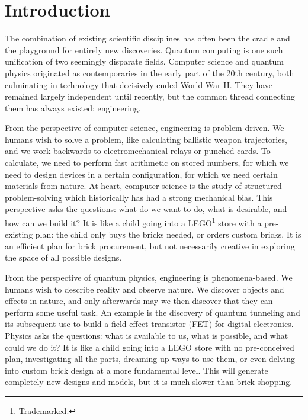 \chapter{Introduction}
\label{chap:intro}

The combination of existing scientific disciplines has often been the
cradle and the playground for entirely new discoveries.
Quantum computing is one such unification of two seemingly disparate
fields.
 Computer science and quantum physics originated
as contemporaries in the early part of the 20th century, both culminating in
technology that decisively ended World War II. They have remained
largely independent until recently, but the common thread connecting them
has always existed: engineering.

From the perspective of computer science, engineering is problem-driven.
We humans wish to solve a problem, like calculating ballistic weapon
trajectories, and we work backwards to electromechanical relays or punched
cards. To calculate,
we need to perform fast
arithmetic on stored numbers, for which we need to design devices in a
certain configuration, for which we need certain materials from nature.
At heart, computer science
is the study of structured problem-solving which historically
has had a strong
mechanical bias. This perspective asks the questions: what do we want to do,
what is desirable, and how can we
build it? It is like a child going into a LEGO\footnote{Trademarked.}
store with a pre-existing plan:
the child only buys the bricks needed, or orders custom bricks.
It is an efficient plan for brick procurement, but not
necessarily creative in exploring the space of all possible designs.

From the perspective of quantum physics, engineering is phenomena-based.
We humans wish to describe reality and observe nature. We discover objects
and effects in nature, and only afterwards may we
then discover that they
can perform some useful task. An example is
the discovery of quantum tunneling and its subsequent use to build a
field-effect transistor (FET) for digital electronics.
Physics asks the
questions: what is available to us, what is possible, and what could we do it?
It is like a child
going into a LEGO store with no pre-conceived plan, investigating all the
parts, dreaming up ways to use them, or even delving into custom brick design
at a more fundamental level. This will generate completely new
designs and models, but it is much slower than brick-shopping.

